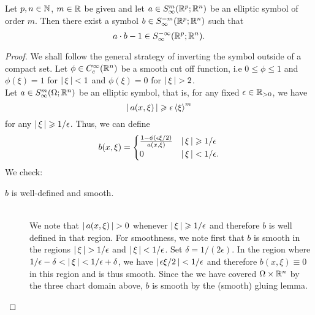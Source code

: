 \documentclass[12pt]{article}
\begin{document}
\begin{flemma}
    Let $p, n \in \N$, $m \in \R$ be given and let $a \in S^m_\infty(\R^p; \R^n)$ be an elliptic symbol of order $m$. Then there exist a symbol $b \in S^{-m}_\infty(\R^p; \R^n)$ such that 
    \[
    a \cdot b - 1 \in S^{-\infty}_\infty(\R^p; \R^n). 
    \]
\end{flemma}
\begin{proof}
    We shall follow the general strategy of inverting the symbol outside of a compact set. Let $\phi \in C^\infty_c(\R^n)$ be a smooth cut off function, i.e $0 \leq \phi \leq 1$ and $ \phi(\xi) = 1$ for $\abs{\xi} < 1$ and $\phi(\xi) = 0 $ for $\abs{\xi} > 2$. \\
    
    Let $a \in S^{m}_\infty(\Omega; \R^n)$ be an elliptic symbol, that is, for any fixed $\epsilon \in \R_{> 0}$, we have 
    \[
    \abs{a(x, \xi)} \geq \epsilon \sym[\xi]^m
    \]
    for any $\abs{\xi} \geq 1/\epsilon$. Thus, we can define 
    \begin{align*}
    b(x, \xi) = 
    \begin{cases}
    \frac{1 - \phi( \epsilon \xi /2)}{a(x, \xi)} & \abs{\xi} \geq 1/ \epsilon \\
    0 & \abs{\xi} < 1 / \epsilon. 
    \end{cases}
    \end{align*}
    We check: 
    \begin{description}
        \item[$b$ is well-defined and smooth. ] \hfill \\
        We note that $\abs{a(x, \xi)} > 0$ whenever $\abs{\xi} \geq 1/\epsilon$ and therefore $b$ is well defined in that region. For smoothness, we note first that $b$ is smooth in the regions $\abs{\xi} > 1/ \epsilon$ and $\abs{\xi} < 1/\epsilon$. Set $\delta = 1/(2 \epsilon)$. In the region where $1/\epsilon - \delta < \abs{\xi} < 1/\epsilon + \delta$, we have $\abs{\epsilon \xi/ 2} < 1/\epsilon$ and therefore $b(x, \xi) \equiv 0$ in this region and is thus smooth. Since the we have covered $\Omega \times \R^n$ by the three chart domain above, $b$ is smooth by the (smooth) gluing lemma. 
        

\end{description}
\end{proof}
\end{document}
